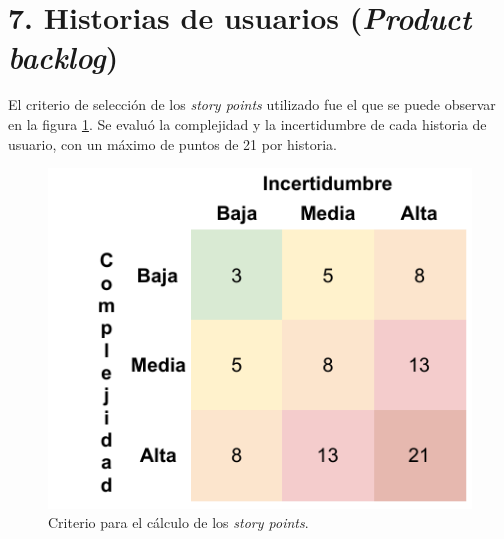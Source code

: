 \documentclass[
11pt, %
]{charter}
\begin{document}
\section{7. Historias de usuarios (\textit{Product backlog})}
\label{sec:backlog}

El criterio de selección de los \textit{story points} utilizado fue el que se puede observar en la figura \ref{fig:storyCriteria}. Se evaluó la complejidad y la incertidumbre de cada historia de usuario, con un máximo de puntos de 21 por historia.

\begin{figure}[htpb]
\centering 
\includegraphics[width=.5\textwidth]{./Figuras/storyCriteria.pdf}
\caption{Criterio para el cálculo de los \textit{story points}.}
\label{fig:storyCriteria}
\end{figure}
\end{document}
